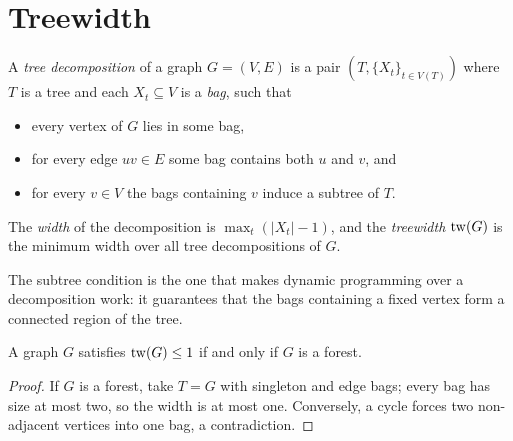 \section{Treewidth}

\begin{definition}[Treewidth]
  A \emph{tree decomposition} of a graph $G = (V, E)$ is a pair
  $(T, \{X_t\}_{t \in V(T)})$ where $T$ is a tree and each $X_t \subseteq V$
  is a \emph{bag}, such that
  \begin{itemize}
    \item every vertex of $G$ lies in some bag,
    \item for every edge $uv \in E$ some bag contains both $u$ and $v$, and
    \item for every $v \in V$ the bags containing $v$ induce a subtree of $T$.
  \end{itemize}
  The \emph{width} of the decomposition is $\max_t (|X_t| - 1)$, and the
  \emph{treewidth} $\operatorname{tw}(G)$ is the minimum width over all tree
  decompositions of $G$.
\end{definition}

The subtree condition is the one that makes dynamic programming over a
decomposition work: it guarantees that the bags containing a fixed vertex
form a connected region of the tree.

\begin{theorem}
  A graph $G$ satisfies $\operatorname{tw}(G) \le 1$ if and only if $G$ is a forest.
\end{theorem}

\begin{proof}
  If $G$ is a forest, take $T = G$ with singleton and edge bags; every bag
  has size at most two, so the width is at most one.  Conversely, a cycle
  forces two non-adjacent vertices into one bag, a contradiction.
\end{proof}


